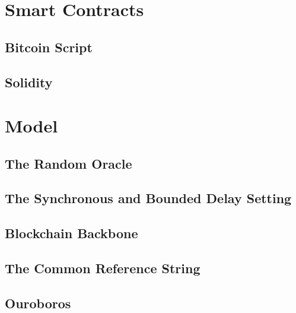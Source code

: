 \section{Smart Contracts}
\subsection{Bitcoin Script}
\subsection{Solidity}


\section{Model}
\subsection{The Random Oracle}
\subsection{The Synchronous and Bounded Delay Setting}
\subsection{Blockchain Backbone}
\subsection{The Common Reference String}
\subsection{Ouroboros}

